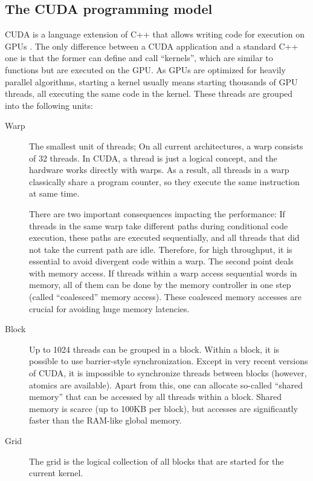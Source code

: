 \documentclass{scrartcl}
\begin{document}
    \subsection{The CUDA programming model}

    CUDA is a language extension of C++ that allows writing code for execution on GPUs \cite{cuda}. The only difference between a CUDA application and a standard C++ one is that the former can define and call ``kernels'', which are similar to functions but are executed on the GPU. As GPUs are optimized for heavily parallel algorithms, starting a kernel usually means starting thousands of GPU threads, all executing the same code in the kernel. These threads are grouped into the following units:

    \begin{description}
        \item[Warp] The smallest unit of threads; On all current architectures, a warp consists of 32 threads. In CUDA, a thread is just a logical concept, and the hardware works directly with warps. As a result, all threads in a warp classically share a program counter, so they execute the same instruction at same time. 
        
        There are two important consequences impacting the performance: If threads in the same warp take different paths during conditional code execution, these paths are executed sequentially, and all threads that did not take the current path are idle. Therefore, for high throughput, it is essential to avoid divergent code within a warp.
        The second point deals with memory access. If threads within a warp access sequential words in memory, all of them can be done by the memory controller in one step (called ``coalesced'' memory access). These coalesced memory accesses are crucial for avoiding huge memory latencies.
        
        \item[Block] Up to 1024 threads can be grouped in a block. Within a block, it is possible to use barrier-style synchronization. Except in very recent versions of CUDA, it is impossible to synchronize threads between blocks (however, atomics are available). Apart from this, one can allocate so-called ``shared memory'' that can be accessed by all threads within a block. 
        Shared memory is scarce (up to 100KB per block), but accesses are significantly faster than the RAM-like global memory.
    
        \item[Grid] The grid is the logical collection of all blocks that are started for the current kernel.
    \end{description}
\end{document}
